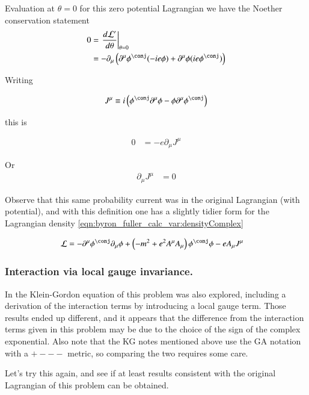 Evaluation at $\theta=0$ for this zero potential Lagrangian we have the Noether conservation statement
\begin{align*}
0 
&=
\left. \frac{d\LL'}{d\theta} \right\vert_{\theta=0} \\
&=
-\partial_\mu \left( \partial^\mu \phi^\conj (-i e \phi ) + \partial^\mu \phi (i e \phi^\conj ) \right)
\end{align*}

Writing

\begin{align}
J^\mu \equiv i \left( \phi^\conj \partial^\mu \phi - \phi \partial^\mu \phi^\conj \right)
\end{align}

this is

\begin{align*}
0 &= - e \partial_\mu J^\mu
\end{align*}

Or 
\begin{align}
\partial_\mu J^\mu &= 0
\end{align}

Observe that this same probability current was in the original Lagrangian (with potential), and with this definition one has a slightly
tidier form for the Lagrangian density \ref{eqn:byron_fuller_calc_var:densityComplex}

\begin{align}\label{eqn:byron_fuller_calc_var:LagrangianWithCurrent}
\LL 
&=
-\partial^\mu \phi^\conj \partial_\mu \phi
+ \left( -m^2 + e^2 A^\mu A_\mu \right) \phi^\conj \phi
- e A_\mu J^\mu 
\end{align}

\subsubsection{Interaction via local gauge invariance. }

In \citep{PJkgNotes} the Klein-Gordon equation of this problem was also explored, including a derivation of the interaction terms
by introducing a local gauge term.  
Those results ended up different, and it appears that the difference from the
interaction terms given in this problem may be due to the choice of the sign of the complex exponential.
Also note that the KG notes mentioned above use the GA notation with a $+---$ metric,
so comparing the two requires some care.

Let's try this again, and see if at least results consistent with the original Lagrangian of this problem can be obtained.

